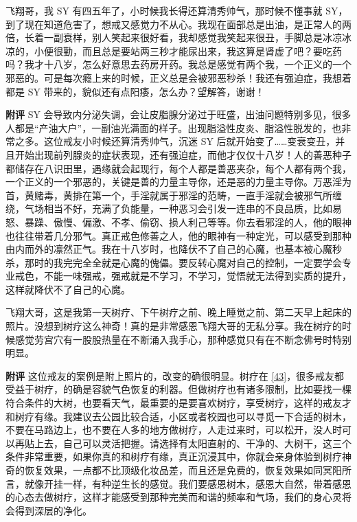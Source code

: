\begin{case}
    飞翔哥，我 SY 有四五年了，小时候我长得还算清秀帅气，那时候不懂事就 SY，到了现在知道危害了，想戒又感觉力不从心。我现在面部总是出油，是正常人的两倍，长着一副衰样，别人笑起来很好看，我却感觉我笑起来很丑，手脚总是冰凉冰凉的，小便很勤，而且总是要站两三秒才能尿出来，我这算是肾虚了吧？要吃药吗？我才十八岁，怎么好意思去药房开药。我总是感觉有两个我，一个正义的一个邪恶的。可是每次瘾上来的时候，正义总是会被邪恶秒杀！我还有强迫症，我想着都是 SY 带来的，貌似还有点阳痿，怎么办？望解答，谢谢！

    \textbf{附评} SY 会导致内分泌失调，会让皮脂腺分泌过于旺盛，出油问题特别多见，很多人都是“产油大户”，一副油光满面的样子。出现脂溢性皮炎、脂溢性脱发的，也非常之多。这位戒友小时候还算清秀帅气，沉迷 SY 后就开始变了……变衰变丑，并且开始出现前列腺炎的症状表现，还有强迫症，而他才仅仅十八岁！人的善恶种子都储存在八识田里，遇缘就会起现行，每个人都是善恶夹杂，每个人都有两个我，一个正义的一个邪恶的，关键是善的力量主导你，还是恶的力量主导你。万恶淫为首，黄赌毒，黄排在第一个，手淫就属于邪淫的范畴，一直手淫就会被邪气所缠绕，气场相当不好，充满了负能量，一种恶习会引发一连串的不良品质，比如易怒、暴躁、傲慢、偏激、不孝、偷窃、损人利己等等。你去看邪淫的人，他的眼神也往往带着几分邪气。真正戒色修善之人，他的眼神有一种定光，可以感受到那种由内而外的凛然正气。我在十八岁时，也降伏不了自己的心魔，也基本被心魔秒杀，那时的我完完全全就是心魔的傀儡。要反转心魔对自己的控制，一定要学会专业戒色，不能一味强戒，强戒就是不学习，不学习，觉悟就无法得到实质的提升，这样就降伏不了自己的心魔。
\end{case}

\begin{case}
    飞翔大哥，这是我第一天树疗、下午树疗之前、晚上睡觉之前、第二天早上起床的照片。没想到树疗这么神奇！真的是非常感恩飞翔大哥的无私分享。我在树疗的时候感觉劳宫穴有一股股热量在不断涌入我手心，那种感觉只有在不断念佛号时特别明显。

    \textbf{附评} 这位戒友的案例是附上照片的，改变的确很明显。树疗在 \ref{43}，很多戒友都受益于树疗，的确是容貌气色恢复的利器。但做树疗也有诸多限制，比如要找一棵符合条件的大树，也要看天气，最重要的是要喜欢树疗，享受树疗，这样的戒友才和树疗有缘。我建议去公园比较合适，小区或者校园也可以寻觅一下合适的树木，不要在马路边上，也不要在人多的地方做树疗，人走过来时，可以松开，没人时可以再贴上去，自己可以灵活把握。请选择有太阳直射的、干净的、大树干，这三个条件非常重要，如果你真的和树疗有缘，真正沉浸其中，你就会亲身体验到树疗神奇的恢复效果，一点都不比顶级化妆品差，而且还是免费的，恢复效果如同冥阳所言，就像开挂一样，有种逆生长的感觉。我们要感恩树木，感恩大自然，带着感恩的心态去做树疗，这样才能感受到那种完美而和谐的频率和气场，我们的身心灵将会得到深层的净化。
\end{case}

